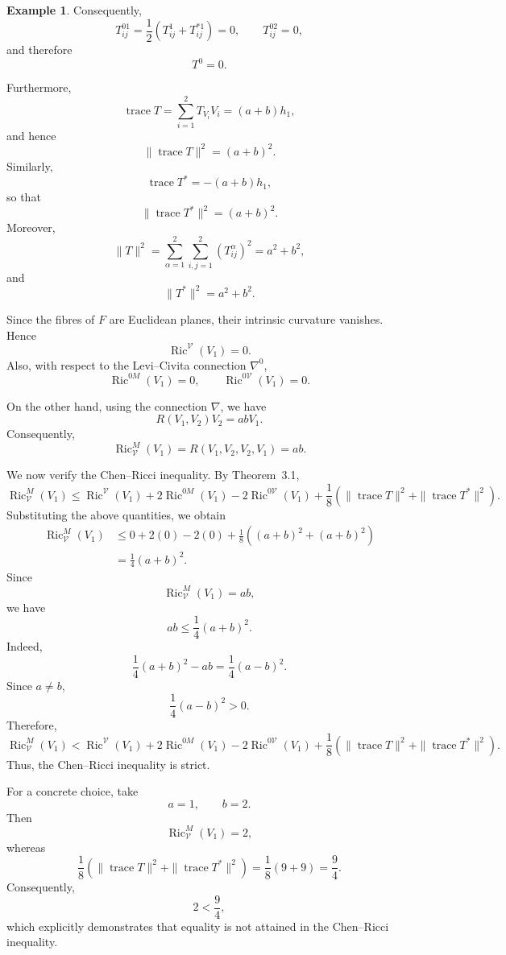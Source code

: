 \documentclass[10pt,a4paper]{article}
\theoremstyle{definition}
\newtheorem{example}[theorem]{Example}
\theoremstyle{remark}
\numberwithin{equation}{section}
\begin{document}
\begin{example}
Consequently,
\[
T^{01}_{ij}
=
\frac12
\left(T^{1}_{ij}+T^{*1}_{ij}\right)
=
0,
\qquad
T^{02}_{ij}=0,
\]
and therefore
\[
T^{0}=0.
\]

Furthermore,
\[
\operatorname{trace}T
=
\sum_{i=1}^{2}T_{V_{i}}V_{i}
=
(a+b)h_{1},
\]
and hence
\[
\|\operatorname{trace}T\|^{2}
=
(a+b)^{2}.
\]
Similarly,
\[
\operatorname{trace}T^{*}
=
-(a+b)h_{1},
\]
so that
\[
\|\operatorname{trace}T^{*}\|^{2}
=
(a+b)^{2}.
\]
Moreover,
\[
\|T\|^{2}
=
\sum_{\alpha=1}^{2}
\sum_{i,j=1}^{2}
\left(T^{\alpha}_{ij}\right)^{2}
=
a^{2}+b^{2},
\]
and
\[
\|T^{*}\|^{2}
=
a^{2}+b^{2}.
\]

Since the fibres of $F$ are Euclidean planes, their intrinsic
curvature vanishes. Hence
\[
\operatorname{Ric}^{\mathcal V}(V_{1})=0.
\]
Also, with respect to the Levi--Civita connection $\nabla^{0}$,
\[
\operatorname{Ric}^{0M}(V_{1})=0,
\qquad
\operatorname{Ric}^{0\mathcal V}(V_{1})=0.
\]

On the other hand, using the connection $\nabla$, we have
\[
R(V_{1},V_{2})V_{2}
=
abV_{1}.
\]
Consequently,
\[
\operatorname{Ric}^{M}_{\mathcal V}(V_{1})
=
R(V_{1},V_{2},V_{2},V_{1})
=
ab.
\]

We now verify the Chen--Ricci inequality. By Theorem~3.1,
\[
\operatorname{Ric}^{M}_{\mathcal V}(V_{1})
\leq
\operatorname{Ric}^{\mathcal V}(V_{1})
+
2\operatorname{Ric}^{0M}(V_{1})
-
2\operatorname{Ric}^{0\mathcal V}(V_{1})
+
\frac18
\left(
\|\operatorname{trace}T\|^{2}
+
\|\operatorname{trace}T^{*}\|^{2}
\right).
\]
Substituting the above quantities, we obtain
\[
\begin{aligned}
\operatorname{Ric}^{M}_{\mathcal V}(V_{1})
&\leq
0+2(0)-2(0)
+
\frac18
\left(
(a+b)^{2}+(a+b)^{2}
\right)\\
&=
\frac14(a+b)^{2}.
\end{aligned}
\]
Since
\[
\operatorname{Ric}^{M}_{\mathcal V}(V_{1})=ab,
\]
we have
\[
ab\leq\frac14(a+b)^{2}.
\]
Indeed,
\[
\frac14(a+b)^{2}-ab
=
\frac14(a-b)^{2}.
\]
Since $a\neq b$,
\[
\frac14(a-b)^{2}>0.
\]
Therefore,
\[
\boxed{
\operatorname{Ric}^{M}_{\mathcal V}(V_{1})
<
\operatorname{Ric}^{\mathcal V}(V_{1})
+
2\operatorname{Ric}^{0M}(V_{1})
-
2\operatorname{Ric}^{0\mathcal V}(V_{1})
+
\frac18
\left(
\|\operatorname{trace}T\|^{2}
+
\|\operatorname{trace}T^{*}\|^{2}
\right)
}.
\]
Thus, the Chen--Ricci inequality is strict.

For a concrete choice, take
\[
a=1,\qquad b=2.
\]
Then
\[
\operatorname{Ric}^{M}_{\mathcal V}(V_{1})=2,
\]
whereas
\[
\frac18
\left(
\|\operatorname{trace}T\|^{2}
+
\|\operatorname{trace}T^{*}\|^{2}
\right)
=
\frac18(9+9)
=
\frac94.
\]
Consequently,
\[
\boxed{
2<\frac94,
}
\]
which explicitly demonstrates that equality is not attained in the
Chen--Ricci inequality.


\end{example}
\end{document}
